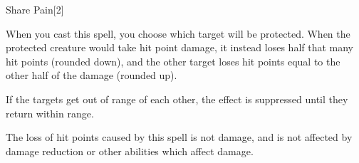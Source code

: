 \begin{spellsection}{Share Pain}[2]
    \begin{spellheader}
    \end{spellheader}
    \begin{spellcontent}
        \begin{spelltargetinginfo}
        \end{spelltargetinginfo}
        \begin{spelleffects}
            \spellspecial When you cast this spell, you choose which target will be protected.
            \spelleffect When the protected creature would take hit point damage, it instead loses half that many hit points (rounded down), and the other target loses hit points equal to the other half of the damage (rounded up).

            If the targets get out of range of each other, the effect is suppressed until they return within range.
            \spelldur \durmed \dismissable
        \end{spelleffects}
    \end{spellcontent}
    \begin{spellfooter}
        \spellnotes The loss of hit points caused by this spell is not damage, and is not affected by damage reduction or other abilities which affect damage.
        \miscastexplode
    \end{spellfooter}
    \begin{spellaugments}
    \end{spellaugments}
\end{spellsection}


